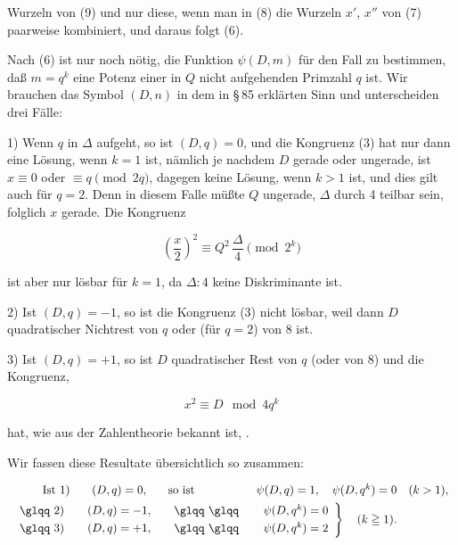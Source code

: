Wurzeln von (9) und nur diese, wenn man in (8) die Wurzeln
$x'$, $x''$ von (7) paarweise kombiniert, und daraus folgt (6).

Nach (6) ist nur noch nötig, die Funktion $\psi(D,m)$ für den
Fall zu bestimmen, daß $m=q^k$ eine Potenz einer in $Q$ nicht
aufgehenden Primzahl $q$ ist. Wir brauchen das Symbol $(D,n)$ in
dem in \S\,85 erklärten Sinn und unterscheiden drei Fälle:

1) Wenn $q$ in $\Delta$ aufgeht, so ist $(D,q)=0$, und die Kongruenz
 (3) hat nur dann eine Lösung, wenn $k=1$ ist, nämlich je
nachdem $D$ gerade oder ungerade, ist $x\equiv 0$ oder $\equiv q \pmod{2q}$,
dagegen keine Lösung, wenn $k>1$ ist, und dies gilt auch für
$q=2$. Denn in diesem Falle müßte $Q$ ungerade, $\Delta$ durch 4
teilbar sein, folglich $x$ gerade. Die Kongruenz

\[ \left(\frac{x}{2}\right)^2 \equiv Q^2\,\frac{\Delta}{4} \pmod{2^k} \]

ist aber nur lösbar für $k=1$, da $\Delta:4$ keine Diskriminante ist.

2) Ist $(D,q)=-1$, so ist die Kongruenz (3) nicht lösbar,
weil dann $D$ quadratischer Nichtrest von $q$ oder (für $q=2$)
von 8 ist.

3) Ist $(D,q)=+1$, so ist $D$ quadratischer Rest von $q$
(oder von 8) und die Kongruenz,

\[ x^2 \equiv D \mod 4q^k \]

hat, wie aus der Zahlentheorie bekannt ist, .

Wir fassen diese Resultate übersichtlich so zusammen:

\[
\begin{array}{rcll}
\text{Ist }1) & (D,q)=0, & \text{so ist} & \psi(D,q)=1,\quad\psi(D,q^k)=0\quad(k>1),\\[0.4em]
\begin{array}{r}\text{\glqq\ }2)\\[0.3em]\text{\glqq\ }3)\end{array}
& \begin{array}{l}(D,q)=-1,\\[0.3em](D,q)=+1,\end{array}
& \begin{array}{c}\text{\glqq\ \glqq}\\[0.3em]\text{\glqq\ \glqq}\end{array}
& \left.\begin{array}{l}\psi(D,q^k)=0\\[0.3em]\psi(D,q^k)=2\end{array}\right\}\quad(k\geqq 1).
\end{array}
\]

